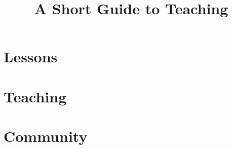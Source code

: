 \documentclass[11pt]{memoir}
\title{A Short Guide to Teaching}
\date{}
\begin{document}
\maketitle
\newpage
\tableofcontents



\part{Lessons}






\part{Teaching}






\part{Community}






\appendix




\end{document}
